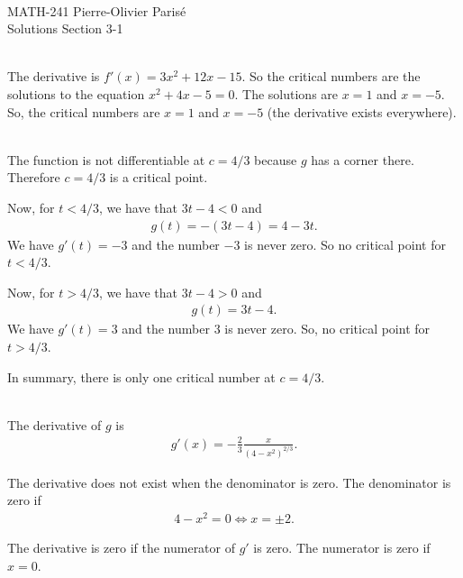 


	\noindent \hrulefill \\
	MATH-241 \hfill Pierre-Olivier Paris{\'e}\\
	Solutions Section 3-1 \hfill \semester \\\vspace*{-1cm}
	
	\noindent\hrulefill
	
	\spc
	
	\\
	The derivative is $f'(x) = 3x^2 + 12x - 15$. So the critical numbers are the solutions to the equation $x^2 + 4x -5= 0$. The solutions are $x = 1$ and $x = -5$. So, the critical numbers are $x = 1$ and $x = -5$ (the derivative exists everywhere).
	
	\spc
	
	\\
	The function is not differentiable at $c = 4/3$ because $g$ has a corner there. Therefore $c = 4/3$ is a critical point. 
	
	Now, for $t < 4/3$, we have that $3t - 4 < 0$ and
		\begin{align*}
		g(t) = -(3t - 4) = 4 - 3t .
		\end{align*}
	We have $g'(t) = -3$ and the number $-3$ is never zero. So no critical point for $t < 4/3$.
	
	Now, for $t > 4/3$, we have that $3t - 4 > 0$ and
		\begin{align*}
		g(t) = 3t - 4 .
		\end{align*}
	We have $g'(t) = 3$ and the number $3$ is never zero. So, no critical point for $t > 4/3$. 
	
	In summary, there is only one critical number at $c = 4/3$. 
	
	\spc
	
	\\
	The derivative of $g$ is
		\begin{align*}
		g'(x) = -\frac{2}{3} \frac{x}{(4 - x^2)^{2/3}} .
		\end{align*}
		
	The derivative does not exist when the denominator is zero. The denominator is zero if
		\begin{align*}
		4 - x^2 = 0 \iff x = \pm 2 .
		\end{align*}
	
	The derivative is zero if the numerator of $g'$ is zero. The numerator is zero if $x = 0$. 
	
